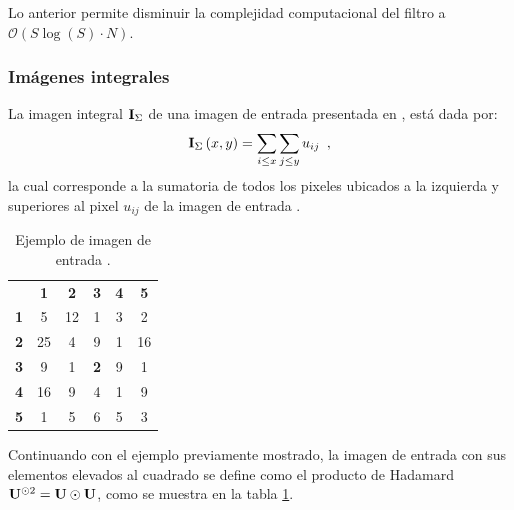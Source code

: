Lo anterior permite disminuir la complejidad computacional del filtro a $\mathcal{O}(S\log(S) \cdot N)$.
 
\subsubsection{Imágenes integrales}


La imagen integral $\mathbf{I}_{\Sigma}$ de una imagen de entrada  presentada en \cite{viola2001robust}, está dada por: 
%
\begin{equation}
\mathbf{I}_{\Sigma}\left(x,y\right)=\sum_{i\leq x}\sum_{j\leq y}u_{ij} \enspace ,
\end{equation}
%
la cual corresponde a la sumatoria de todos los  pixeles ubicados a la izquierda y superiores al pixel $u_{ij}$ de la imagen de entrada .

\begin{table}[htb]
\begin{center}
\caption{Ejemplo de imagen de entrada .\label{table:imageExample2}}

\renewcommand{\arraystretch}{1.4}
\setlength\tabcolsep{3pt}

{
\begin{tabular}{cc|ccc|c}
 & \multicolumn{1}{c}{\textbf{1}} & \textbf{2} & \textbf{3} & \multicolumn{1}{c}{\textbf{4}} & \textbf{5}\tabularnewline
\textbf{1} & \multicolumn{1}{c}{5} & 12 & 1 & \multicolumn{1}{c}{3} & 2\tabularnewline
\cline{3-5} 
\textbf{2} & 25 & 4 & 9 & 1 & 16\tabularnewline
\textbf{3} & 9 & 1 & \textbf{2} & 9 & 1\tabularnewline
\textbf{4} & 16 & 9 & 4 & 1 & 9\tabularnewline
\cline{3-5} 
\textbf{5} & \multicolumn{1}{c}{1} & 5 & 6 & \multicolumn{1}{c}{5} & 3\tabularnewline
\end{tabular}
}
\par\end{center} 
\end{table}


Continuando con el ejemplo previamente mostrado, la imagen de entrada  con sus elementos elevados al cuadrado se define como el producto de Hadamard $\mathbf{U}^{\odot 2} = \mathbf{U} \odot \mathbf{U}$, como se muestra en la tabla \ref{table:imageExample2}. 


